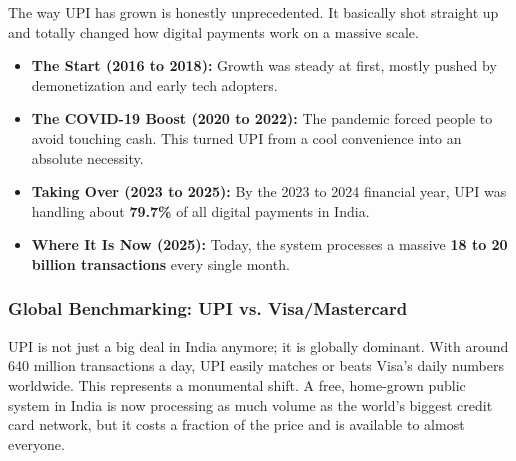 The way UPI has grown is honestly unprecedented. It basically shot straight up and totally changed how digital payments work on a massive scale.

\begin{itemize}
    \item \textbf{The Start (2016 to 2018):} Growth was steady at first, mostly pushed by demonetization and early tech adopters.
    \item \textbf{The COVID-19 Boost (2020 to 2022):} The pandemic forced people to avoid touching cash. This turned UPI from a cool convenience into an absolute necessity.
    \item \textbf{Taking Over (2023 to 2025):} By the 2023 to 2024 financial year, UPI was handling about \textbf{79.7\%} of all digital payments in India.
    \item \textbf{Where It Is Now (2025):} Today, the system processes a massive \textbf{18 to 20 billion transactions} every single month.
\end{itemize}

\subsubsection{Global Benchmarking: UPI vs. Visa/Mastercard}

UPI is not just a big deal in India anymore; it is globally dominant. With around 640 million transactions a day, UPI easily matches or beats Visa's daily numbers worldwide. This represents a monumental shift. A free, home-grown public system in India is now processing as much volume as the world's biggest credit card network, but it costs a fraction of the price and is available to almost everyone.